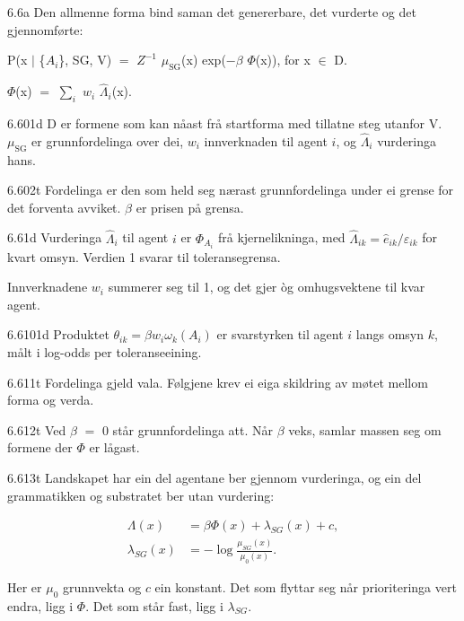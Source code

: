 \begin{formproposition}{6.6}{a}
Den allmenne forma bind saman det genererbare, det vurderte og det gjennomførte:

P(x \(|\) \{\(A_{i}\)\}, SG, V) \(=\) \(Z^{-1}\) \(μ_{\mathrm{SG}}\)(x) exp(\(−\)\(β\) \(Φ\)(x)), for x \(∈\) D.

\(Φ\)(x) \(=\) \(∑_{i}\) \(w_{i}\) \(\hat{Λ}_{i}\)(x).
\end{formproposition}

\begin{formproposition}{6.601}{d}
D er formene som kan nåast frå startforma med tillatne steg utanfor V. \(μ_{\mathrm{SG}}\) er grunnfordelinga over dei, \(w_i\) innverknaden til agent \(i\), og \(\hat\Lambda_i\) vurderinga hans.
\end{formproposition}

\begin{formproposition}{6.602}{t}
Fordelinga er den som held seg nærast grunnfordelinga under ei grense for det forventa avviket. \(\beta\) er prisen på grensa.
\end{formproposition}

\begin{formproposition}{6.61}{d}
Vurderinga \(\hat\Lambda_i\) til agent \(i\) er \(\Phi_{A_i}\) frå kjernelikninga, med \(\hat\Lambda_{ik}=\hat e_{ik}/\varepsilon_{ik}\) for kvart omsyn. Verdien 1 svarar til toleransegrensa.

Innverknadene \(w_i\) summerer seg til 1, og det gjer òg omhugsvektene til kvar agent.
\end{formproposition}

\begin{formproposition}{6.6101}{d}
Produktet \(\theta_{ik}=\beta w_i\omega_k(A_i)\) er svarstyrken til agent \(i\) langs omsyn \(k\), målt i log-odds per toleranseeining.
\end{formproposition}

\begin{formproposition}{6.611}{t}
Fordelinga gjeld vala. Følgjene krev ei eiga skildring av møtet mellom forma og verda.
\end{formproposition}

\begin{formproposition}{6.612}{t}
Ved \(β\) \(=\) 0 står grunnfordelinga att. Når \(β\) veks, samlar massen seg om formene der \(Φ\) er lågast.
\end{formproposition}

\begin{formproposition}{6.613}{t}
Landskapet har ein del agentane ber gjennom vurderinga, og ein del grammatikken og substratet ber utan vurdering:

\[
\begin{aligned}
\Lambda(x)&=\beta\Phi(x)+\lambda_{SG}(x)+c,\\
\lambda_{SG}(x)&=-\log\frac{\mu_{SG}(x)}{\mu_0(x)}.
\end{aligned}
\]

Her er \(\mu_0\) grunnvekta og \(c\) ein konstant. Det som flyttar seg når prioriteringa vert endra, ligg i \(\Phi\). Det som står fast, ligg i \(\lambda_{SG}\).
\end{formproposition}

